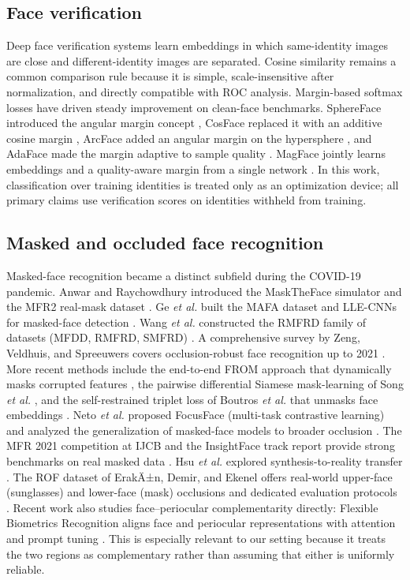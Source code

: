 ﻿\documentclass[10pt,journal,compsoc]{IEEEtran}
\begin{document}
\subsection{Face verification}
Deep face verification systems learn embeddings in which same-identity images are close and different-identity images are separated. Cosine similarity remains a common comparison rule because it is simple, scale-insensitive after normalization, and directly compatible with ROC analysis. Margin-based softmax losses have driven steady improvement on clean-face benchmarks. SphereFace introduced the angular margin concept \cite{sphereface}, CosFace replaced it with an additive cosine margin \cite{cosface}, ArcFace added an angular margin on the hypersphere \cite{arcface}, and AdaFace made the margin adaptive to sample quality \cite{adaface}. MagFace jointly learns embeddings and a quality-aware margin from a single network \cite{magface}. In this work, classification over training identities is treated only as an optimization device; all primary claims use verification scores on identities withheld from training.

\subsection{Masked and occluded face recognition}
Masked-face recognition became a distinct subfield during the COVID-19 pandemic. Anwar and Raychowdhury introduced the MaskTheFace simulator and the MFR2 real-mask dataset \cite{mfr2}. Ge \textit{et al.} built the MAFA dataset and LLE-CNNs for masked-face detection \cite{llecnn}. Wang \textit{et al.} constructed the RMFRD family of datasets (MFDD, RMFRD, SMFRD) \cite{rmfrd}. A comprehensive survey by Zeng, Veldhuis, and Spreeuwers covers occlusion-robust face recognition up to 2021 \cite{surveyocc}. More recent methods include the end-to-end FROM approach that dynamically masks corrupted features \cite{from2022}, the pairwise differential Siamese mask-learning of Song \textit{et al.} \cite{masklearn}, and the self-restrained triplet loss of Boutros \textit{et al.} that unmasks face embeddings \cite{umr}. Neto \textit{et al.} proposed FocusFace (multi-task contrastive learning) \cite{focusface} and analyzed the generalization of masked-face models to broader occlusion \cite{beyondmasks}. The MFR 2021 competition at IJCB and the InsightFace track report provide strong benchmarks on real masked data \cite{mfr2021,insightfacemfr}. Hsu \textit{et al.} explored synthesis-to-reality transfer \cite{hsu2022}. The ROF dataset of ErakÄ±n, Demir, and Ekenel offers real-world upper-face (sunglasses) and lower-face (mask) occlusions and dedicated evaluation protocols \cite{rof}. Recent work also studies face--periocular complementarity directly: Flexible Biometrics Recognition aligns face and periocular representations with attention and prompt tuning \cite{fbr2024}. This is especially relevant to our setting because it treats the two regions as complementary rather than assuming that either is uniformly reliable.
\end{document}
